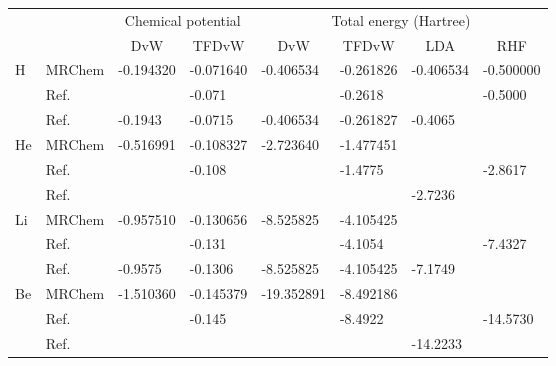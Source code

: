 \begin{table}
\footnotesize
\begin{center}
\begin{tabular}{ll|ll|llll}
\hline
\hline
    &			    &\multicolumn{2}{|c|}{Chemical potential}&\multicolumn{4}{|c}{Total energy (Hartree)}\\
    &			    &
\multicolumn{1}{|c}{DvW}&
\multicolumn{1}{c|}{TFDvW}&
\multicolumn{1}{c}{DvW}&
\multicolumn{1}{c}{TFDvW}&
\multicolumn{1}{c}{LDA}&
\multicolumn{1}{c}{RHF}\\
\hline                                                      
H   & MRChem			&  -0.194320    &  -0.071640    &   -0.406534   &  -0.261826    &   -0.406534   &   -0.500000   \\
    & Ref.\cite{Chan:2000}	&	        &  -0.071	&		&  -0.2618      &	        &   -0.5000     \\
    & Ref.\cite{Karasiev:2012}  &  -0.1943      &  -0.0715      &   -0.406534   &  -0.261827    &   -0.4065     &	        \\
\hline                                                      
He  & MRChem			&  -0.516991    &  -0.108327    &   -2.723640   &  -1.477451    &	        &	        \\
    & Ref.\cite{Chan:2000}	&	        &  -0.108       &               &  -1.4775      &	        &   -2.8617     \\
    & Ref.\cite{Karasiev:2012}	&	        &               &               &               &   -2.7236     &	        \\
\hline                                                      
Li  & MRChem			&  -0.957510    &  -0.130656    &   -8.525825   &  -4.105425    &	        &		\\
    & Ref.\cite{Chan:2000}	&	        &  -0.131       &               &  -4.1054      &	        &   -7.4327	\\
    & Ref.\cite{Karasiev:2012}	&  -0.9575      &  -0.1306      &   -8.525825   &  -4.105425    &   -7.1749     &	        \\
\hline                                                      
Be  & MRChem			&  -1.510360    &  -0.145379    &  -19.352891   &  -8.492186    &	        &	        \\
    & Ref.\cite{Chan:2000}	&	        &  -0.145       &               &  -8.4922      &	        &  -14.5730     \\
    & Ref.\cite{Karasiev:2012}	&	        &               &               &               &  -14.2233     &	        \\

\end{tabular}
\end{center}
\end{table}
